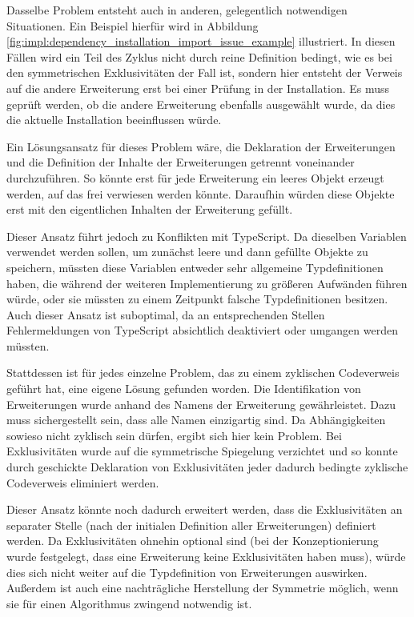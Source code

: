Dasselbe Problem entsteht auch in anderen, gelegentlich notwendigen Situationen. Ein Beispiel hierfür wird in Abbildung \ref{fig:impl:dependency_installation_import_issue_example} illustriert. In diesen Fällen wird ein Teil des Zyklus nicht durch reine Definition bedingt, wie es bei den symmetrischen Exklusivitäten der Fall ist, sondern hier entsteht der Verweis auf die andere Erweiterung erst bei einer Prüfung in der Installation. Es muss geprüft werden, ob die andere Erweiterung ebenfalls ausgewählt wurde, da dies die aktuelle Installation beeinflussen würde.

Ein Lösungsansatz für dieses Problem wäre, die Deklaration der Erweiterungen und die Definition der Inhalte der Erweiterungen getrennt voneinander durchzuführen. So könnte erst für jede Erweiterung ein leeres Objekt erzeugt werden, auf das frei verwiesen werden könnte. Daraufhin würden diese Objekte erst mit den eigentlichen Inhalten der Erweiterung gefüllt.

Dieser Ansatz führt jedoch zu Konflikten mit TypeScript. Da dieselben Variablen verwendet werden sollen, um zunächst leere und dann gefüllte Objekte zu speichern, müssten diese Variablen entweder sehr allgemeine Typdefinitionen haben, die während der weiteren Implementierung zu größeren Aufwänden führen würde, oder sie müssten zu einem Zeitpunkt falsche Typdefinitionen besitzen. Auch dieser Ansatz ist suboptimal, da an entsprechenden Stellen Fehlermeldungen von TypeScript absichtlich deaktiviert oder umgangen werden müssten.

Stattdessen ist für jedes einzelne Problem, das zu einem zyklischen Codeverweis geführt hat, eine eigene Lösung gefunden worden. Die Identifikation von Erweiterungen wurde anhand des Namens der Erweiterung gewährleistet. Dazu muss sichergestellt sein, dass alle Namen einzigartig sind. Da Abhängigkeiten sowieso nicht zyklisch sein dürfen, ergibt sich hier kein Problem. Bei Exklusivitäten wurde auf die symmetrische Spiegelung verzichtet und so konnte durch geschickte Deklaration von Exklusivitäten jeder dadurch bedingte zyklische Codeverweis eliminiert werden.

Dieser Ansatz könnte noch dadurch erweitert werden, dass die Exklusivitäten an separater Stelle (nach der initialen Definition aller Erweiterungen) definiert werden. Da Exklusivitäten ohnehin optional sind (bei der Konzeptionierung wurde festgelegt, dass eine Erweiterung keine Exklusivitäten haben muss), würde dies sich nicht weiter auf die Typdefinition von Erweiterungen auswirken. Außerdem ist auch eine nachträgliche Herstellung der Symmetrie möglich, wenn sie für einen Algorithmus zwingend notwendig ist.

